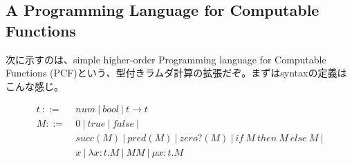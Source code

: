 \documentclass[9pt,fleqn]{jarticle}
\begin{document}
\subsection{A Programming Language for Computable Functions}

次に示すのは、simple higher-order Programming language for Computable Functions (PCF)という、型付きラムダ計算の拡張だぞ。まずはsyntaxの定義はこんな感じ。

\begin{align}
	t\ ::=\ &num\ |\ bool\ |\ t \rightarrow t \nonumber \\
	M ::=\ &0\ |\ true\ |\ false\ | \nonumber\\
	&succ(M)\ |\ pred(M)\ |\ zero?(M)\ |\ if\ M\ then\ M\ else\ M\ | \nonumber \\
	&x\ |\ \lambda x:t.M\ |\ MM\ |\ \mu x:t.M \nonumber
\end{align}
\end{document}
